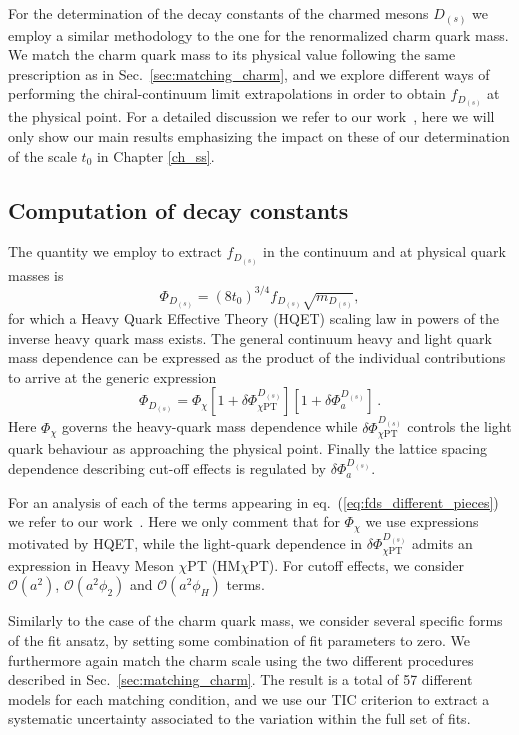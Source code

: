 For the determination of the decay constants of the charmed mesons $D_{(s)}$ we employ a similar methodology to the one for the renormalized charm quark mass. We match the charm quark mass to its physical value following the same prescription as in Sec.~\ref{sec:matching_charm}, and we explore different ways of performing the chiral-continuum limit extrapolations in order to obtain $f_{D_{(s)}}$ at the physical point. For a detailed discussion we refer to our work~\citep{charm}, here we will only show our main results emphasizing the impact on these of our determination of the scale $t_0$ in Chapter \ref{ch_ss}.

\subsection{Computation of decay constants}

The quantity we employ to extract $f_{D_{(s)}}$ in the continuum and at physical quark masses is
\begin{equation}
  \Phi_{D_{(s)}} = (8t_0)^{3/4}f_{D_{(s)}} \sqrt{m_{D_{(s)}}},
  \label{eq:defphiD}
\end{equation}
for which a Heavy Quark Effective Theory (HQET) scaling law in powers of the inverse
heavy quark mass exists.
The general continuum heavy and light quark mass dependence can be expressed as the product of the individual contributions to arrive at the generic expression 
\begin{equation}
	\Phi_{D_{(s)}} = \Phi_{\chi} \left[
	1 + \delta\Phi_{\chi\mathrm{PT}}^{D_{(s)}}
	\right]
	\left[
	1 + \delta\Phi_a^{D_{(s)}}
	\right]\,.
	\label{eq:fds_different_pieces}
\end{equation}
Here $\Phi_\chi$ governs the heavy-quark mass dependence while  $\delta\Phi_{\chi\mathrm{PT}}^{D_{(s)}}$ controls the light quark behaviour as approaching the physical point. Finally the lattice spacing dependence describing cut-off effects is regulated by $\delta\Phi_a^{D_{(s)}}$. 

For an analysis of each of the terms appearing in eq.~(\ref{eq:fds_different_pieces}) we refer to our work~\citep{charm}. Here we only comment that for $\Phi_{\chi}$ we use expressions motivated by HQET, while the light-quark dependence in $\delta\Phi_{\chi\mathrm{PT}}^{D_{(s)}}$ admits an expression in Heavy Meson $\chi$PT (HM$\chi$PT). For cutoff effects, we consider $\mathcal{O}(a^2)$, $\mathcal{O}(a^2\phi_2)$ and $\mathcal{O}(a^2\phi_H)$ terms.

Similarly to the case of the charm quark mass, we consider several specific forms of the fit ansatz,
by setting some combination of fit parameters to zero. We furthermore again match the charm scale using
the two different procedures described in Sec.~\ref{sec:matching_charm}. The result is a total
of 57 different models  for each matching condition,
and we use our TIC criterion to extract a systematic uncertainty associated to the variation
within the full set of fits.

